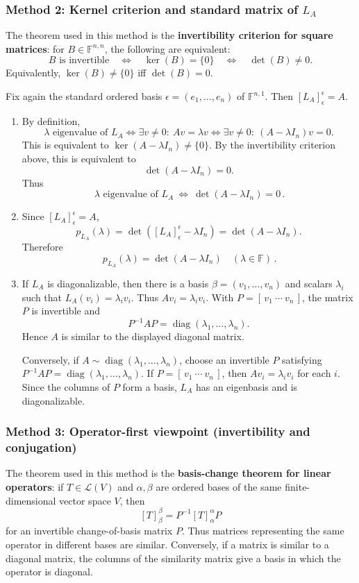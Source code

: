 \documentclass[12pt]{article}
\newcommand{\F}{\mathbb{F}}
\newcommand{\cL}{\mathcal{L}}
\DeclareMathOperator{\diag}{diag}
\begin{document}
\newpage
\subsubsection{Method 2: Kernel criterion and standard matrix of $L_A$}
The theorem used in this method is the \textbf{invertibility criterion for square matrices}: for $B\in\F^{n,n}$, the following are equivalent:
\[
B\text{ is invertible}
\quad\Longleftrightarrow\quad
\ker(B)=\{0\}
\quad\Longleftrightarrow\quad
\det(B)\neq 0.
\]
Equivalently, $\ker(B)\neq\{0\}$ iff $\det(B)=0$.

Fix again the standard ordered basis $\epsilon=(e_1,
\dots,e_n)$ of $\F^{n,1}$. Then $[L_A]_{\epsilon}^{\epsilon}=A$.

\begin{enumerate}[label=(\alph*)]
\item By definition,
\[
\lambda\text{ eigenvalue of }L_A
\Longleftrightarrow
\exists v\neq 0:\ Av=\lambda v
\Longleftrightarrow
\exists v\neq 0:\ (A-\lambda I_n)v=0.
\]
This is equivalent to $\ker(A-\lambda I_n)\neq\{0\}$. By the invertibility criterion above, this is equivalent to
\[
\det(A-\lambda I_n)=0.
\]
Thus
\[
\boxed{\,\lambda\text{ eigenvalue of }L_A\ \Longleftrightarrow\ \det(A-\lambda I_n)=0\,}.
\]

\item Since $[L_A]_{\epsilon}^{\epsilon}=A$,
\[
p_{L_A}(\lambda)=\det([L_A]_{\epsilon}^{\epsilon}-\lambda I_n)=\det(A-\lambda I_n).
\]
Therefore
\[
\boxed{\,p_{L_A}(\lambda)=\det(A-\lambda I_n)\quad(\lambda\in\F)\,}.
\]

\item If $L_A$ is diagonalizable, then there is a basis $\beta=(v_1,\dots,v_n)$ and scalars $\lambda_i$ such that $L_A(v_i)=\lambda_i v_i$. Thus $Av_i=\lambda_i v_i$. With $P=[\,v_1\ \cdots\ v_n\,]$, the matrix $P$ is invertible and
\[
P^{-1}AP=\diag(\lambda_1,\dots,\lambda_n).
\]
Hence $A$ is similar to the displayed diagonal matrix.

Conversely, if $A\sim\diag(\lambda_1,\dots,\lambda_n)$, choose an invertible $P$ satisfying $P^{-1}AP=\diag(\lambda_1,\dots,\lambda_n)$. If $P=[\,v_1\ \cdots\ v_n\,]$, then $Av_i=\lambda_i v_i$ for each $i$. Since the columns of $P$ form a basis, $L_A$ has an eigenbasis and is diagonalizable.
\end{enumerate}

\newpage
\subsubsection{Method 3: Operator-first viewpoint (invertibility and conjugation)}
The theorem used in this method is the \textbf{basis-change theorem for linear operators}: if $T\in\cL(V)$ and $\alpha,\beta$ are ordered bases of the same finite-dimensional vector space $V$, then
\[
[T]_{\beta}^{\beta}=P^{-1}[T]_{\alpha}^{\alpha}P
\]
for an invertible change-of-basis matrix $P$. Thus matrices representing the same operator in different bases are similar. Conversely, if a matrix is similar to a diagonal matrix, the columns of the similarity matrix give a basis in which the operator is diagonal.
\end{document}

